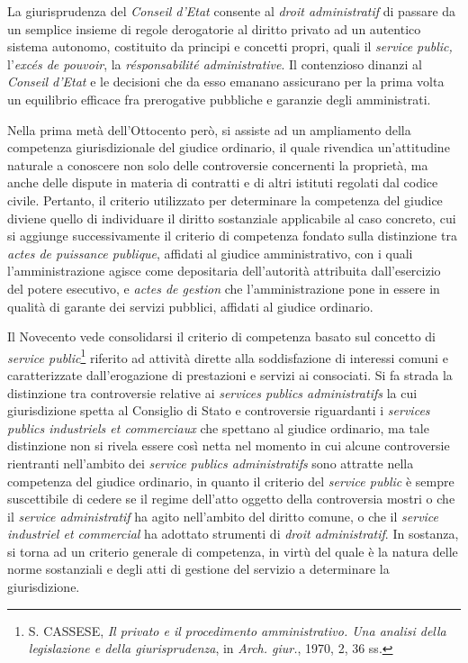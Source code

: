 \documentclass[12pt,it,a4paper,]{report}
\begin{document}
La giurisprudenza del \emph{Conseil d'Etat} consente al \emph{droit
administratif} di passare da un semplice insieme di regole derogatorie
al diritto privato ad un autentico sistema autonomo, costituito da
principi e concetti propri, quali il \emph{service public,}
l'\emph{excés de pouvoir}, la \emph{résponsabilité administrative}. Il
contenzioso dinanzi al \emph{Conseil d'Etat} e le decisioni che da esso
emanano assicurano per la prima volta un equilibrio efficace fra
prerogative pubbliche e garanzie degli amministrati.

Nella prima metà dell'Ottocento però, si assiste ad un ampliamento della
competenza giurisdizionale del giudice ordinario, il quale rivendica
un'attitudine naturale a conoscere non solo delle controversie
concernenti la proprietà, ma anche delle dispute in materia di contratti
e di altri istituti regolati dal codice civile. Pertanto, il criterio
utilizzato per determinare la competenza del giudice diviene quello di
individuare il diritto sostanziale applicabile al caso concreto, cui si
aggiunge successivamente il criterio di competenza fondato sulla
distinzione tra \emph{actes de puissance publique}, affidati al giudice
amministrativo, con i quali l'amministrazione agisce come depositaria
dell'autorità attribuita dall'esercizio del potere esecutivo, e
\emph{actes de gestion} che l'amministrazione pone in essere in qualità
di garante dei servizi pubblici, affidati al giudice ordinario.

Il Novecento vede consolidarsi il criterio di competenza basato sul
concetto di \emph{service public}\footnote{S. CASSESE, \emph{Il privato
  e il procedimento amministrativo. Una analisi della legislazione e
  della giurisprudenza}, in \emph{Arch. giur.}, 1970, 2, 36 ss.}
riferito ad attività dirette alla soddisfazione di interessi comuni e
caratterizzate dall'erogazione di prestazioni e servizi ai consociati.
Si fa strada la distinzione tra controversie relative ai \emph{services
publics administratifs} la cui giurisdizione spetta al Consiglio di
Stato e controversie riguardanti i \emph{services publics industriels et
commerciaux} che spettano al giudice ordinario, ma tale distinzione non
si rivela essere così netta nel momento in cui alcune controversie
rientranti nell'ambito dei \emph{service publics administratifs} sono
attratte nella competenza del giudice ordinario, in quanto il criterio
del \emph{service public} è sempre suscettibile di cedere se il regime
dell'atto oggetto della controversia mostri o che il \emph{service
administratif} ha agito nell'ambito del diritto comune, o che il
\emph{service industriel et commercial} ha adottato strumenti di
\emph{droit administratif}. In sostanza, si torna ad un criterio
generale di competenza, in virtù del quale è la natura delle norme
sostanziali e degli atti di gestione del servizio a determinare la
giurisdizione.
\end{document}
